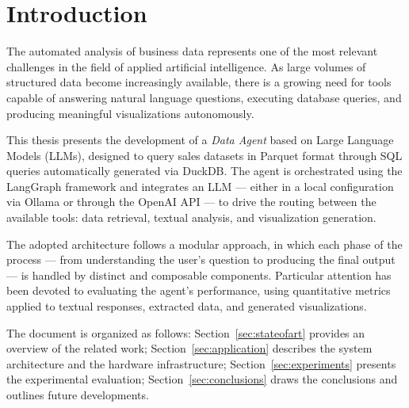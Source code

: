 \documentclass[11pt,a4paper]{article}
\begin{document}



\section{Introduction}
\label{sec:introduction}
The automated analysis of business data represents one of the most relevant challenges in the field of applied artificial intelligence.
As large volumes of structured data become increasingly available, there is a growing need for tools capable of answering natural language questions,
executing database queries, and producing meaningful visualizations autonomously.

This thesis presents the development of a \textit{Data Agent} based on Large Language Models (LLMs),
designed to query sales datasets in Parquet format through SQL queries automatically generated via DuckDB.
The agent is orchestrated using the LangGraph framework and integrates an LLM --- either in a local configuration via Ollama or through the OpenAI API ---
to drive the routing between the available tools: data retrieval, textual analysis, and visualization generation.

The adopted architecture follows a modular approach, in which each phase of the process --- from understanding the user's question to producing the final output ---
is handled by distinct and composable components. Particular attention has been devoted to evaluating the agent's performance,
using quantitative metrics applied to textual responses, extracted data, and generated visualizations.

The document is organized as follows: Section~\ref{sec:stateofart} provides an overview of the related work;
Section~\ref{sec:application} describes the system architecture and the hardware infrastructure;
Section~\ref{sec:experiments} presents the experimental evaluation;
Section~\ref{sec:conclusions} draws the conclusions and outlines future developments.
\end{document}
